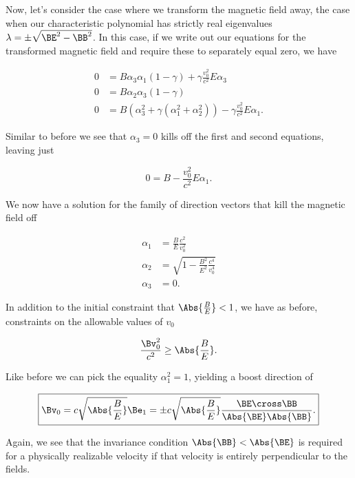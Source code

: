 Now, let's consider the case where we transform the magnetic field away, the case when our characteristic polynomial has strictly real eigenvalues $\lambda = \pm \sqrt{\BE^2 - \BB^2}$.  In this case, if we write out our equations for the transformed magnetic field and require these to separately equal zero, we have

\begin{align}\label{eqn:relElectroDynProblemSet3:1740}
0 &= B \alpha_3 \alpha_1 ( 1 - \gamma ) + \gamma \frac{v_0^2}{c^2} E \alpha_3 \\
0 &= B \alpha_2 \alpha_3 ( 1 - \gamma ) \\
0 &= B (\alpha_3^2 + \gamma (\alpha_1^2 + \alpha_2^2)) - \gamma \frac{v_0^2}{c^2} E \alpha_1.
\end{align}

Similar to before we see that $\alpha_3 = 0$ kills off the first and second equations, leaving just

\begin{equation}\label{eqn:relElectroDynProblemSet3:1760}
0 = B - \frac{v_0^2}{c^2} E \alpha_1.
\end{equation}

We now have a solution for the family of direction vectors that kill the magnetic field off

\begin{align}\label{eqn:relElectroDynProblemSet3:1780}
\alpha_1 &= \frac{B}{E} \frac{c^2}{v_0^2} \\
\alpha_2 &= \sqrt{ 1 - \frac{B^2}{E^2} \frac{c^4}{v_0^4} } \\
\alpha_3 &= 0.
\end{align}

In addition to the initial constraint that $\Abs{\frac{B}{E}} < 1$, we have as before, constraints on the allowable values of $v_0$

\begin{equation}\label{eqn:relElectroDynProblemSet3:1800}
\frac{\Bv_0^2}{c^2} \ge \Abs{\frac{B}{E}}.
\end{equation}

Like before we can pick the equality $\alpha_1^2 = 1$, yielding a boost direction of

\begin{equation}\label{eqn:relElectroDynProblemSet3:1880}
\boxed{
\Bv_0 = c \sqrt{\Abs{\frac{B}{E}}} \Be_1 = \pm c \sqrt{\Abs{\frac{B}{E}}} \frac{\BE \cross \BB}{\Abs{\BE} \Abs{\BB}}.
}
\end{equation}

Again, we see that the invariance condition $\Abs{\BB} < \Abs{\BE}$ is required for a physically realizable velocity if that velocity is entirely perpendicular to the fields.
